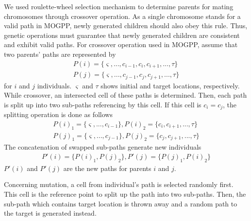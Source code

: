 \documentclass[10pt,journal]{IEEEtran}
\begin{document}
We used roulette-wheel selection mechanism to determine parents for mating chromosomes through crossover  operation. As a single chromosome stands for a valid path in MOGPP, newly generated children should also obey this rule. Thus, genetic operations must guarantee that newly generated children are consistent and exhibit valid paths. For crossover operation used in MOGPP, assume that two parents' paths are represented by 
\begin{gather*}
P(i)=\lbrace \varsigma, ..., c_{i-1}, c_{i}, c_{i+1}, ..., \tau \rbrace \\
P(j)=\lbrace \varsigma, ..., c_{j-1}, c_{j}, c_{j+1}, ..., \tau \rbrace
\end{gather*}
for $i$ and $j$ individuals. $\varsigma$ and $\tau$ shows initial and target locations, respectively. While crossover, an intersected cell of these paths is determined. Then, each path is split up into two sub-paths referencing by this cell. If this cell is $c_{i} = c_{j}$, the splitting operation is done as follows
\begin{gather*}
P(i)_{1}=\lbrace \varsigma, ..., c_{i-1} \rbrace, 
P(i)_{2}=\lbrace c_{i}, c_{i+1}, ..., \tau \rbrace \\
P(j)_{1}=\lbrace \varsigma, ..., c_{j-1} \rbrace, 
P(j)_{2}=\lbrace c_{j}, c_{j+1}, ..., \tau \rbrace
\end{gather*}
The concatenation of swapped sub-paths generate new individuals
\begin{gather*}
P'(i)=\lbrace P(i)_{1}, P(j)_{2} \rbrace, 
P'(j)=\lbrace P(j)_{1}, P(i)_{2} \rbrace 
\end{gather*}
$P'(i)$ and $P'(j)$ are the new paths for parents $i$ and $j$.


Concerning mutation,  a cell from individual's path is selected randomly first. This cell is the reference point to split up the path into two sub-paths. Then, the sub-path which contains target location is thrown away and a random path to the target is generated instead. %

\end{document}
